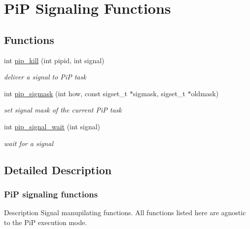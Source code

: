 \hypertarget{group__PiP-6-signal}{\section{Pi\-P Signaling Functions}
\label{group__PiP-6-signal}
}
\subsection*{Functions}
\begin{DoxyCompactItemize}
\item 
int \hyperlink{group__PiP-6-signal_ga4a396f38920d94b71dcfd3c898fbb82b}{pip\-\_\-kill} (int pipid, int signal)
\begin{DoxyCompactList}\small\item\em deliver a signal to Pi\-P task \end{DoxyCompactList}\item 
int \hyperlink{group__PiP-6-signal_gaf546ee24368b118e937aadd2dbea2217}{pip\-\_\-sigmask} (int how, const sigset\-\_\-t $\ast$sigmask, sigset\-\_\-t $\ast$oldmask)
\begin{DoxyCompactList}\small\item\em set signal mask of the current Pi\-P task \end{DoxyCompactList}\item 
int \hyperlink{group__PiP-6-signal_ga2048e7685a030e61e8c529c474899feb}{pip\-\_\-signal\-\_\-wait} (int signal)
\begin{DoxyCompactList}\small\item\em wait for a signal \end{DoxyCompactList}\end{DoxyCompactItemize}


\subsection{Detailed Description}
\hypertarget{pip-signal}{}\subsubsection{Pi\-P signaling functions}\label{pip-signal}
\begin{DoxyParagraph}{Description}
Signal manupilating functions. All functions listed here are agnostic to the Pi\-P execution mode. 
\end{DoxyParagraph}


